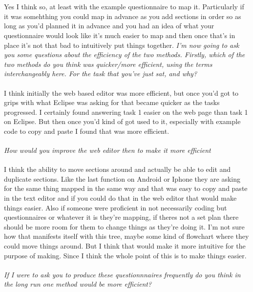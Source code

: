 \documentclass{report}
\begin{document}
\\
\\
Yes I think so, at least with the example questionnaire to map it. Particularly if it was somehthing you could map in advance as you add sections in order so as long as you'd planned it in advance and you had an idea of what your questionnaire would look like it's much easier to map and then once that's in place it's not that bad to intuitively put things together.
\textit{I'm now going to ask you some questions about the efficiency of the two methods. Firstly, which of the two methods do you think was quicker/more efficient, using the terms interchangeably here. For the task that you've just sat, and why?}                                                                                                                                                                                                                                                                \\
\\
I think initially the web based editor was more efficient, but once you'd got to grips with what Eclipse was asking for that became quicker as the tasks progressed. I certainly found answering task 1 easier on the web page than task 1 on Eclipse. But then once you'd kind of got used to it, especially with example code to copy and paste I found that was more efficient.
\\
\\
\textit{How would you improve the web editor then to make it more efficient}
\\
\\
I think the ability to move sections around and actually be able to edit and duplicate sections. Like the last function on Android or Iphone they are asking for the same thing mapped in the same way and that was easy to copy and paste in the text editor and if you could do that in the web editor that would make things easier. Also if someone were proficient in not necessarily coding but questionnaires or whatever it is they're mapping, if theres not a set plan there should be more room for them to change things as they're doing it. I'm not sure how that manifests itself with this tree, maybe some kind of flowchart where they could move things around. But I think that would make it more intuitive for the purpose of making. Since I think the whole point of this is to make things easier.
\\
\\
\textit{If I were to ask you to produce these questionnnaires frequently do you think in the long run one method would be more efficient?}
\end{document}
